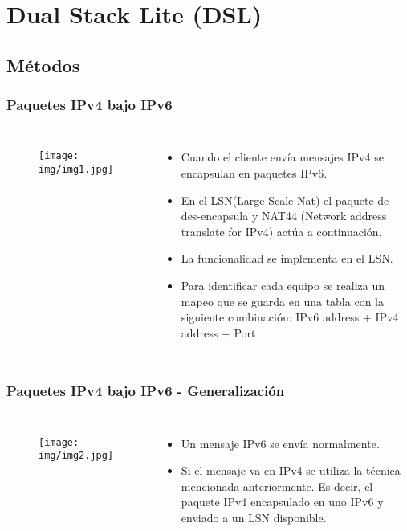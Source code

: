 \section{Dual Stack Lite (DSL)}
\subsection{Métodos}

\begin{frame}
  \frametitle{Paquetes IPv4 bajo IPv6}
  \begin{columns}[t]
    	\begin{figure}
		\centering
		\texttt{[image: img/img1.jpg]}
	\end{figure}
    	\begin{itemize} %
		\footnotesize
		\item
			Cuando el cliente envía mensajes IPv4 se
			encapsulan en paquetes IPv6.
		\item
			En el LSN(Large Scale Nat) el paquete de 
			des-encapsula y NAT44 (Network address 
			translate for IPv4) actúa a continuación.
		\item
			La funcionalidad se implementa en el LSN.
		\item
			Para identificar cada equipo se realiza un mapeo
			que se guarda en una tabla con la siguiente 
			combinación: IPv6 address + IPv4 address + Port
	\end{itemize}
  \end{columns}
\end{frame}

\begin{frame}
  \frametitle{Paquetes IPv4 bajo IPv6 - Generalización}
  \begin{columns}[t]
    	\begin{figure}
		\centering
		\texttt{[image: img/img2.jpg]}
	\end{figure}
	 \begin{itemize}
		\item
			Un mensaje IPv6 se envía normalmente.
		\item
			Si el mensaje va en IPv4 se utiliza la 
			técnica mencionada anteriormente. Es decir, 
			el paquete IPv4 encapsulado en uno IPv6 y 
			enviado a un LSN disponible.
	\end{itemize}
  \end{columns}
\end{frame}

